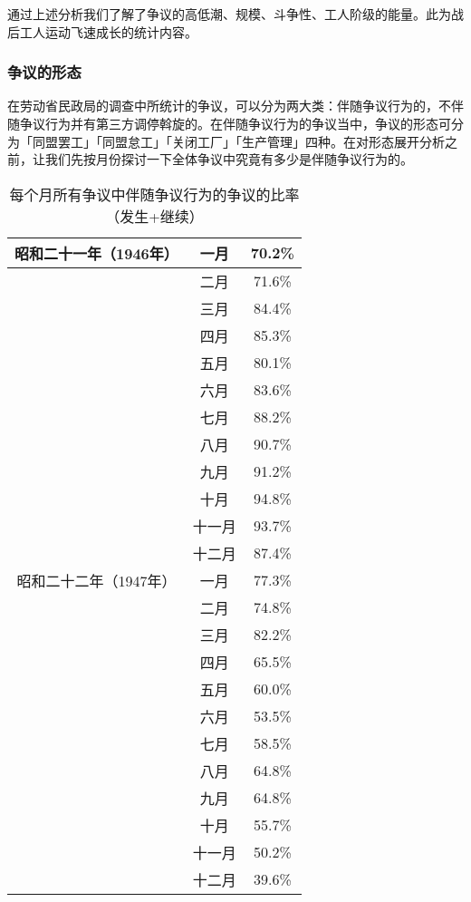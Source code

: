 \documentclass[a4paper,12pt]{article}
\begin{document}
通过上述分析我们了解了争议的高低潮、规模、斗争性、工人阶级的能量。此为战后工人运动飞速成长的统计内容。

\subsubsection{争议的形态}

在劳动省民政局的调查中所统计的争议，可以分为两大类：伴随争议行为的，不伴随争议行为并有第三方调停斡旋的。在伴随争议行为的争议当中，争议的形态可分为「同盟罢工」「同盟怠工」「关闭工厂」「生产管理」四种。在对形态展开分析之前，让我们先按月份探讨一下全体争议中究竟有多少是伴随争议行为的。

\begin{table}
  \begin{tabular}{|c|c|c|}
    \hline
    昭和二十一年（1946年） & 一月 & 70.2\% \\ 
    \hline
                         & 二月 & 71.6\% \\ 
    \hline
                         & 三月 & 84.4\% \\ 
    \hline
                         & 四月 & 85.3\% \\ 
    \hline
                         & 五月 & 80.1\% \\ 
    \hline
                         & 六月 & 83.6\% \\ 
    \hline
                         & 七月 & 88.2\% \\ 
    \hline
                         & 八月 & 90.7\% \\ 
    \hline
                         & 九月 & 91.2\% \\ 
    \hline
                         & 十月 & 94.8\% \\ 
    \hline
                         & 十一月 & 93.7\% \\ 
    \hline
                         & 十二月 & 87.4\% \\ 
    \hline
    昭和二十二年（1947年） & 一月 & 77.3\% \\ 
    \hline
                         & 二月 & 74.8\% \\ 
    \hline
                         & 三月 & 82.2\% \\ 
    \hline
                         & 四月 & 65.5\% \\ 
    \hline
                         & 五月 & 60.0\% \\ 
    \hline
                         & 六月 & 53.5\% \\ 
    \hline
                         & 七月 & 58.5\% \\ 
    \hline
                         & 八月 & 64.8\% \\ 
    \hline
                         & 九月 & 64.8\% \\ 
    \hline
                         & 十月 & 55.7\% \\ 
    \hline
                         & 十一月 & 50.2\% \\ 
    \hline
                         & 十二月 & 39.6\% \\ 
    \hline
  \end{tabular}
  \caption{每个月所有争议中伴随争议行为的争议的比率（发生+继续）}
\end{table}
\end{document}

